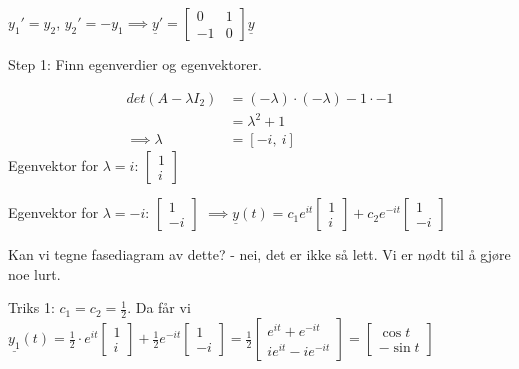 \documentclass[11pt, a4paper, norsk]{article}
\begin{document}
            \begin{Example}{}{}
                $y_{1}' = y_2$, $y_{2}' = -y_1 \implies \underline{y}' = \begin{bmatrix}
                    0 & 1 \\
                    -1 & 0
                \end{bmatrix}\underline{y}$

                Step 1: Finn egenverdier og egenvektorer.

                \begin{align*}
                    det(A - \lambda I_2) &= (-\lambda)\cdot (-\lambda) - 1\cdot -1
                    \\
                                         &= \lambda^2 +1
                                         \\
                    \implies \lambda &= \left[ - i, \  i\right]
                \end{align*}
               Egenvektor for $\lambda = i$: $\begin{bmatrix}
                   1 \\
                   i
               \end{bmatrix}$ 

               Egenvektor for $\lambda = -i$: $\begin{bmatrix}
                   1 \\
                   -i
               \end{bmatrix}$
               $\implies \underline{y}(t) = c_1e^{it}\begin{bmatrix}
                   1 \\
                   i
               \end{bmatrix} + c_2e^{-it}\begin{bmatrix}
                   1 \\
                   -i
               \end{bmatrix}$

               Kan vi tegne fasediagram av dette? - nei, det er ikke så lett. Vi er nødt til å gjøre noe lurt. 

               Triks 1: $c_1 = c_2 = \frac{1}{2}$. Da får vi $\underline{y_1}(t) = \frac{1}{2}\cdot e^{it}\begin{bmatrix}
                   1 \\
                   i
               \end{bmatrix} + \frac{1}{2} e^{-it}\begin{bmatrix}
                   1 \\
                   -i
               \end{bmatrix} = \frac{1}{2} \begin{bmatrix}
               e^{it} + e^{-it} \\
               ie^{it} - ie^{-it}
               \end{bmatrix} = \begin{bmatrix}
               \cos{t} \\
               -\sin{t}
               \end{bmatrix}$



\end{Example}
\end{document}
